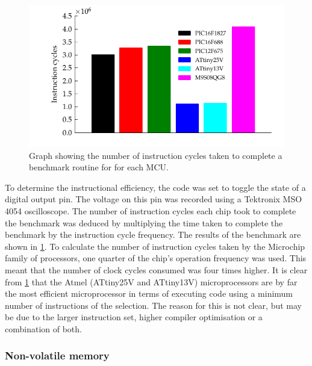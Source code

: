       \begin{figure}
          \begin{centering}
              \includegraphics{content/pt1/03-EnergyRequirements/graphics/Graph_All_Clock_Benchmark}
          \end{centering}
          \protect\caption{\label{fig:GraphBar_All_Benchmark}Graph showing the number of instruction cycles taken to complete a benchmark routine for  for each MCU.}
      \end{figure}

      To determine the instructional efficiency, the code was set to toggle the state of a digital output pin.
      The voltage on this pin was recorded using a Tektronix MSO 4054 oscilloscope.
      The number of instruction cycles each chip took to complete the benchmark was deduced by multiplying the time taken to complete the benchmark by the instruction cycle frequency.
      The results of the benchmark are shown in \cref{fig:GraphBar_All_Benchmark}.
      To calculate the number of instruction cycles taken by the Microchip family of processors, one quarter of the chip's operation frequency was used.
      This meant that the number of clock cycles consumed was four times higher.
      It is clear from \cref{fig:GraphBar_All_Benchmark} that the Atmel (ATtiny25V and ATtiny13V) microprocessors are by far the most efficient microprocessor in terms of executing code using a minimum number of instructions of the selection.
      The reason for this is not clear, but may be due to the larger instruction set, higher compiler optimisation or a combination of both.



    \subsubsection{Non-volatile memory}

